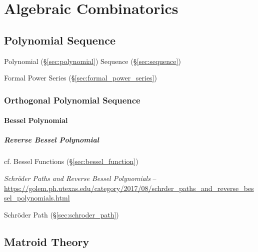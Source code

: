 \section{Algebraic Combinatorics}\label{sec:algebraic_combinatorics}

\subsection{Polynomial Sequence}\label{sec:polynomial_sequence}

Polynomial (\S\ref{sec:polynomial}) Sequence (\S\ref{sec:sequence})

\fist Formal Power Series (\S\ref{sec:formal_power_series})



\subsubsection{Orthogonal Polynomial Sequence}
\label{sec:orthogonal_polynomial_sequence}

\paragraph{Bessel Polynomial}\label{sec:bessel_polynomial}\hfill

\subparagraph{Reverse Bessel Polynomial}\label{sec:reverse_bessel_polynomial}
\hfill

cf. Bessel Functions (\S\ref{sec:bessel_function})

\emph{Schr\"oder Paths and Reverse Bessel Polynomials} --
\url{https://golem.ph.utexas.edu/category/2017/08/schrder_paths_and_reverse_bessel_polynomials.html}

Schr\"oder Path (\S\ref{sec:schroder_path})



\subsection{Matroid Theory}\label{sec:matroid_theory}


